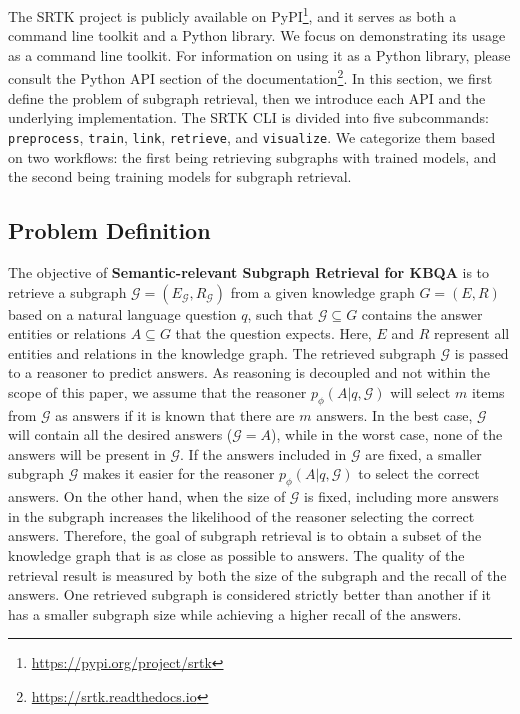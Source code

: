 \documentclass[runningheads]{llncs}
\begin{document}
The SRTK project is publicly available on PyPI\footnote{\url{https://pypi.org/project/srtk}}, and it serves as both a command line toolkit and a Python library. We focus on demonstrating its usage as a command line toolkit. For information on using it as a Python library, please consult the Python API section of the documentation\footnote{\url{https://srtk.readthedocs.io}}. In this section, we first define the problem of subgraph retrieval, then we introduce each API and the underlying implementation. The SRTK CLI is divided into five subcommands:  \texttt{preprocess}, \texttt{train}, \texttt{link}, \texttt{retrieve}, and \texttt{visualize}. We categorize them based on two workflows: the first being retrieving subgraphs with trained models, and the second being training models for subgraph retrieval.

\subsection{Problem Definition}

The objective of \textbf{Semantic-relevant Subgraph Retrieval for KBQA} is to retrieve a subgraph $\mathcal{G} = (E_\mathcal{G}, R_\mathcal{G})$ from a given knowledge graph $G = (E, R)$ based on a natural language question $q$, such that $\mathcal{G} \subseteq G$ contains the answer entities or relations $A \subseteq G $ that the question expects. Here, $E$ and $R$ represent all entities and relations in the knowledge graph. The retrieved subgraph $\mathcal{G}$ is passed to a reasoner to predict answers. As reasoning is decoupled and not within the scope of this paper, we assume that the reasoner $p_\phi(A|q,\mathcal G)$ will select $m$ items from $\mathcal G$ as answers if it is known that there are $m$ answers.  In the best case, $\mathcal{G}$ will contain all the desired answers ($\mathcal{G} = A$), while in the worst case, none of the answers will be present in $\mathcal{G}$. If the answers included in $\mathcal{G}$ are fixed, a smaller subgraph $\mathcal{G}$ makes it easier for the reasoner $p_\phi(A|q,\mathcal G)$ to select the correct answers. On the other hand, when the size of $\mathcal{G}$ is fixed, including more answers in the subgraph increases the likelihood of the reasoner selecting the correct answers. Therefore, the goal of subgraph retrieval is to obtain a subset of the knowledge graph that is as close as possible to answers. The quality of the retrieval result is measured by both the size of the subgraph and the recall of the answers. One retrieved subgraph is considered strictly better than another if it has a smaller subgraph size while achieving a higher recall of the answers.
\end{document}
